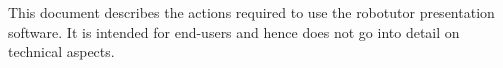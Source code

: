 This document describes the actions required to use the robotutor presentation software. It is intended for end-users and hence does not go into detail on technical aspects.\\